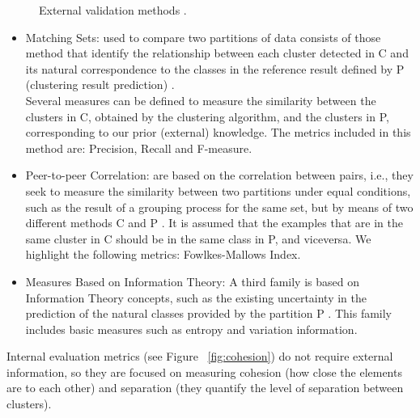 \begin{figure}[htbp]
  \centering
    \caption{External validation methods \citep{b54}.}%
    \label{fig:external}%
\end{figure}

\begin{itemize}
  \item Matching Sets: used to compare two partitions of data consists of those method that identify the relationship between each cluster detected in C and its natural correspondence to the classes in the reference result defined by P (clustering result prediction) \citep{b54}.\\
Several measures can be defined to measure the similarity between the clusters in C, obtained by the clustering algorithm, and the clusters in P, corresponding to our prior (external) knowledge. The metrics included in this method are: Precision, Recall and F-measure.
  \item Peer-to-peer Correlation: are based on the correlation between pairs, i.e., they seek to measure the similarity between two partitions under equal conditions, such as the result of a grouping process for the same set, but by means of two different methods C and P \citep{b54}. It is assumed that the examples that are in the same cluster in C should be in the same class in P, and viceversa. We highlight the following metrics: Fowlkes-Mallows Index.
  \item Measures Based on Information Theory: A third family is based on Information Theory concepts, such as the existing uncertainty in the prediction of the natural classes provided by the partition P \citep{b54}. This family includes basic measures such as entropy and variation information.
\end{itemize}

Internal evaluation metrics (see Figure ~\ref{fig:cohesion}) do not require external information, so they are focused on measuring cohesion (how close the elements are to each other) and separation (they quantify the level of separation between clusters).

